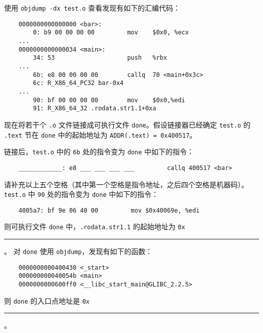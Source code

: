 \begin{problems}
        \qn 使用 \verb|objdump -dx test.o| 查看发现有如下的汇编代码：
        \begin{verbatim}
    0000000000000000 <bar>: 
        0: b9 00 00 00 00         mov    $0x0, %ecx
    ... 
    0000000000000034 <main>: 
        34: 53                    push   %rbx
    ... 
        6b: e8 00 00 00 00        callq  70 <main+0x3c> 
        6c: R_X86_64_PC32 bar-0x4 
    ... 
        90: bf 00 00 00 00        mov    $0x0,%edi 
        91: R_X86_64_32 .rodata.str1.1+0xa 
        \end{verbatim}
        现在将若干个 \verb|.o| 文件链接成可执行文件 \verb|done|。假设链接器已经确定 \verb|test.o| 的 \verb|.text| 节在 \verb|done| 中的起始地址为 \verb|ADDR(.text) = 0x400517|。

        \subqn 链接后，\verb|test.o| 中的 \verb|6b| 处的指令变为 \verb|done| 中如下的指令：
        \begin{verbatim}
    ____________: e8 ___ ___ ___ ___         callq 400517 <bar>
        \end{verbatim}
        请补充以上五个空格（其中第一个空格是指令地址，之后四个空格是机器码）。
        \subqn \verb|test.o| 中 \verb|90| 处的指令变为 \verb|done| 中如下的指令：
        \begin{verbatim}
    4005a7: bf 9e 06 40 00         mov $0x40069e, %edi
        \end{verbatim}
        则可执行文件 \verb|done| 中，\verb|.rodata.str1.1| 的起始地址为 \verb|0x|\rule{2.5cm}{0.25mm}。
        \qn 对 \verb|done| 使用 \verb|objdump|，发现有如下的函数：
        \begin{verbatim}
    0000000000400430 <_start>
    000000000040054b <main>
    0000000000600ff0 <__libc_start_main@GLIBC_2.2.5>
        \end{verbatim}
        则 \verb|done| 的入口点地址是 \verb|0x|\rule{2.5cm}{0.25mm}。
    \end{problems}